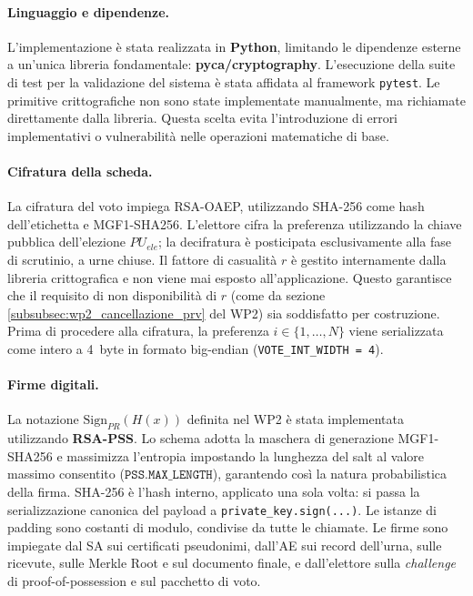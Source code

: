\paragraph{Linguaggio e dipendenze.} L'implementazione è stata realizzata in \textbf{Python}, limitando le dipendenze esterne a un'unica libreria fondamentale: \textbf{pyca/cryptography}. L'esecuzione della suite di test per la validazione del sistema è stata affidata al framework \texttt{pytest}. Le primitive crittografiche non sono state implementate manualmente, ma richiamate direttamente dalla libreria. Questa scelta evita l'introduzione di errori implementativi o vulnerabilità nelle operazioni matematiche di base.

\paragraph{Cifratura della scheda.} La cifratura del voto impiega RSA-OAEP, utilizzando SHA-256 come hash dell'etichetta e MGF1-SHA256. L'elettore cifra la preferenza utilizzando la chiave pubblica dell'elezione $PU_{ele}$; la decifratura è posticipata esclusivamente alla fase di scrutinio, a urne chiuse. Il fattore di casualità $r$ è gestito internamente dalla libreria crittografica e non viene mai esposto all'applicazione. Questo garantisce che il requisito di non disponibilità di $r$ (come da sezione \ref{subsubsec:wp2_cancellazione_prv} del WP2) sia soddisfatto per costruzione. Prima di procedere alla cifratura, la preferenza $i \in \{1,\ldots,N\}$ viene serializzata come intero a 4~byte in formato big-endian (\texttt{VOTE\_INT\_WIDTH~=~4}).

\paragraph{Firme digitali.} La notazione $\mathrm{Sign}_{PR}(H(x))$ definita nel WP2 è
stata implementata utilizzando \textbf{RSA-PSS}. Lo schema adotta la maschera di generazione MGF1-SHA256 e massimizza l'entropia impostando la lunghezza del salt al valore massimo consentito ($\texttt{PSS.MAX\_LENGTH}$),    garantendo così la natura probabilistica della firma. SHA-256 è l'hash interno, applicato una sola volta: si passa la serializzazione canonica del payload a \texttt{private\_key.sign(...)}. Le
istanze di padding sono costanti di modulo, condivise da tutte le chiamate. Le
firme sono impiegate dal SA sui certificati pseudonimi, dall'AE sui record
dell'urna, sulle ricevute, sulle Merkle Root e sul documento finale, e
dall'elettore sulla \emph{challenge} di proof-of-possession e sul pacchetto di
voto.

